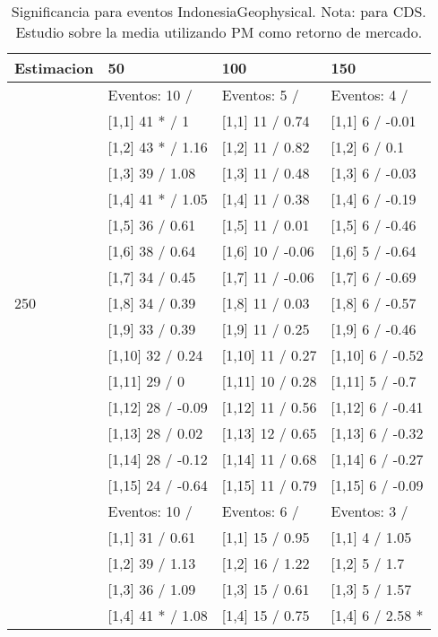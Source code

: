 \begin{table}

\caption{Significancia para eventos IndonesiaGeophysical. Nota: para CDS. Estudio sobre la media utilizando PM como retorno de mercado.}
\centering
\begin{tabular}[t]{llll}
\toprule
Estimacion & 50 & 100 & 150\\
\midrule
 & Eventos:  10 / & Eventos:  5 / & Eventos:  4 /\\
 & {}[1,1] 41 * / 1 & {}[1,1] 11  / 0.74 & {}[1,1] 6  / -0.01\\
 & {}[1,2] 43 * / 1.16 & {}[1,2] 11  / 0.82 & {}[1,2] 6  / 0.1\\
 & {}[1,3] 39  / 1.08 & {}[1,3] 11  / 0.48 & {}[1,3] 6  / -0.03\\
 & {}[1,4] 41 * / 1.05 & {}[1,4] 11  / 0.38 & {}[1,4] 6  / -0.19\\
\addlinespace
 & {}[1,5] 36  / 0.61 & {}[1,5] 11  / 0.01 & {}[1,5] 6  / -0.46\\
 & {}[1,6] 38  / 0.64 & {}[1,6] 10  / -0.06 & {}[1,6] 5  / -0.64\\
 & {}[1,7] 34  / 0.45 & {}[1,7] 11  / -0.06 & {}[1,7] 6  / -0.69\\
250 & {}[1,8] 34  / 0.39 & {}[1,8] 11  / 0.03 & {}[1,8] 6  / -0.57\\
 & {}[1,9] 33  / 0.39 & {}[1,9] 11  / 0.25 & {}[1,9] 6  / -0.46\\
\addlinespace
 & {}[1,10] 32  / 0.24 & {}[1,10] 11  / 0.27 & {}[1,10] 6  / -0.52\\
 & {}[1,11] 29  / 0 & {}[1,11] 10  / 0.28 & {}[1,11] 5  / -0.7\\
 & {}[1,12] 28  / -0.09 & {}[1,12] 11  / 0.56 & {}[1,12] 6  / -0.41\\
 & {}[1,13] 28  / 0.02 & {}[1,13] 12  / 0.65 & {}[1,13] 6  / -0.32\\
 & {}[1,14] 28  / -0.12 & {}[1,14] 11  / 0.68 & {}[1,14] 6  / -0.27\\
\addlinespace
 & {}[1,15] 24  / -0.64 & {}[1,15] 11  / 0.79 & {}[1,15] 6  / -0.09\\
 & Eventos:  10 / & Eventos:  6 / & Eventos:  3 /\\
 & {}[1,1] 31  / 0.61 & {}[1,1] 15  / 0.95 & {}[1,1] 4  / 1.05\\
 & {}[1,2] 39  / 1.13 & {}[1,2] 16  / 1.22 & {}[1,2] 5  / 1.7\\
 & {}[1,3] 36  / 1.09 & {}[1,3] 15  / 0.61 & {}[1,3] 5  / 1.57\\
\addlinespace
 & {}[1,4] 41 * / 1.08 & {}[1,4] 15  / 0.75 & {}[1,4] 6  / 2.58 *\\

\end{tabular}
\end{table}

